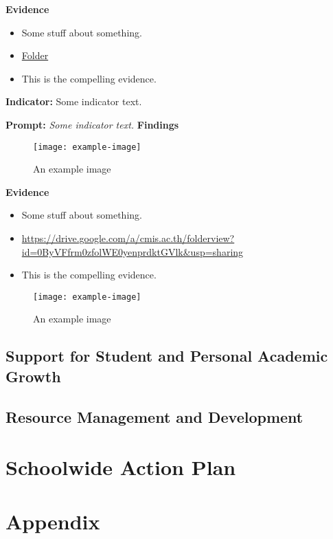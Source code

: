 \documentclass{report}
\begin{document}
\noindent\textbf{Evidence}
\vspace{-\topsep}

\begin{itemize}[leftmargin=*]
\setlength{\parskip}{0pt}
\setlength{\itemsep}{0pt plus 1pt}
\item Some stuff about something.
\item \href{https://drive.google.com/a/cmis.ac.th/folderview?id=0ByVFfrm0zfolWE0yenprdktGVlk&usp=sharing}{Folder}
\item This is the compelling evidence.
\end{itemize}

\noindent\textbf{Indicator:} Some indicator text.

\noindent\textbf{Prompt:} \textit{Some indicator text.}
\noindent\textbf{Findings}

\blindtext

\blinditemize[6]

\blindtext

\begin{figure}[h!]
\caption[An example image]{An example image}
\centering
\texttt{[image: example-image]}
\end{figure}


\noindent\textbf{Evidence}
\vspace{-\topsep}

\begin{itemize}[leftmargin=*]
\setlength{\parskip}{0pt}
\setlength{\itemsep}{0pt plus 1pt}
\item Some stuff about something.
\item \url{https://drive.google.com/a/cmis.ac.th/folderview?id=0ByVFfrm0zfolWE0yenprdktGVlk&usp=sharing}
\item This is the compelling evidence.
\end{itemize}

\begin{figure}[h!]
\caption[An example image]{An example image}
\centering
\texttt{[image: example-image]}
\end{figure}


\section{Support for Student and Personal Academic Growth}
\section{Resource Management and Development}
\chapter{Schoolwide Action Plan}
\chapter{Appendix}
\listoffigures
\end{document}
